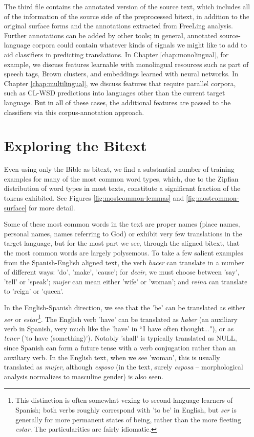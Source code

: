 The third file contains the annotated version of the source text, which
includes all of the information of the source side of the preprocessed bitext,
in addition to the original surface forms and the annotations extracted from
FreeLing analysis. Further annotations can be added by other tools; in general,
annotated source-language corpora could contain whatever kinds of signals we
might like to add to aid classifiers in predicting translations. In Chapter
\ref{chap:monolingual}, for example, we discuss features learnable with
monolingual resources such as part of speech tags, Brown clusters, and
embeddings learned with neural networks. In Chapter \ref{chap:multilingual}, we
discuss features that require parallel corpora, such as CL-WSD predictions into
languages other than the current target language. But in all of these cases,
the additional features are passed to the classifiers via this
corpus-annotation approach.


\section{Exploring the Bitext}
\label{sec:exploring}
Even using only the Bible as bitext, we find a substantial number of
training examples for many of the most common word types, which, due to the
Zipfian distribution of word types in most texts, constitute a significant
fraction of the tokens exhibited.
See Figures \ref{fig:mostcommon-lemmas} and \ref{fig:mostcommon-surface} for more detail.

Some of these most common words in the text are proper names (place names,
personal names, names referring to God) or exhibit very few translations in the
target language, but for the most part we see, through the aligned bitext, that
the most common words are largely polysemous.  To take a few salient examples
from the Spanish-English aligned text, the verb \emph{hacer} can translate in a
number of different ways: 'do', 'make', 'cause'; for \emph{decir}, we must
choose between 'say', 'tell' or 'speak'; \emph{mujer} can mean either 'wife' or
'woman'; and \emph{reina} can translate to 'reign' or 'queen'.

In the English-Spanish direction, we see that the 'be' can be translated as
either \emph{ser} or \emph{estar}\footnote{This distinction is often somewhat
vexing to second-language learners of Spanish; both verbs roughly correspond
with 'to be' in English, but \emph{ser} is generally for more permanent states
of being, rather than the more fleeting \emph{estar}. The particularities are
fairly idiomatic.}. The English verb 'have' can be translated as \emph{haber}
(an auxiliary verb in Spanish, very much like the 'have' in ``I have often
thought..."), or as \emph{tener} ('to have (something)'). Notably 'shall' is
typically translated as NULL, since Spanish can form a future tense with a verb
conjugation rather than an auxiliary verb. In the English text, when we see
'woman', this is usually translated as \emph{mujer}, although \emph{esposo} (in
the text, surely \emph{esposa} -- morphological analysis normalizes to
masculine gender) is also seen.


